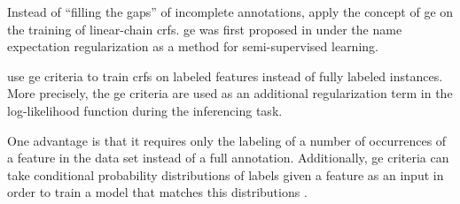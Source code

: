Instead of ``filling the gaps'' of incomplete annotations, \citet{mann2008generalized} apply the concept of \gls{ge} on the training of linear-chain \glspl{crf}.
\Gls{ge} was first proposed in \citet{mann2007simple} under the name \gls{expectation regularization} as a method for semi-supervised learning.

\citet{mann2008generalized} use \gls{ge} criteria to train \glspl{crf} on labeled features instead of fully labeled instances.
More precisely, the \gls{ge} criteria are used as an additional regularization term in the log-likelihood function during the inferencing task.

One advantage is that it requires only the labeling of a number of occurrences of a feature in the data set instead of a full annotation.
Additionally, \gls{ge} criteria can take \glspl{conditional probability distribution} of labels given a feature as an input in order to train a model that matches this distributions \citep{mann2008generalized}.

\bigskip


